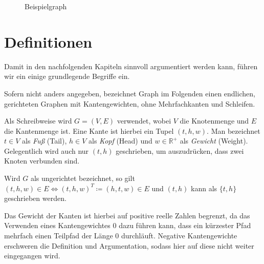 \begin{figure}[ht]
  \caption{Beispielgraph}
  \label{graphs:fig:beispielgraph}
\end{figure}

\section{Definitionen}
Damit in den nachfolgenden Kapiteln sinnvoll argumentiert werden kann, führen wir ein einige grundlegende Begriffe ein.

\begin{definition}[Graph]
  Sofern nicht anders angegeben, bezeichnet Graph im Folgenden einen endlichen, gerichteten Graphen mit Kantengewichten, ohne Mehrfachkanten und Schleifen.

  Als Schreibweise wird $G = (V, E)$ verwendet, wobei $V$ die Knotenmenge und $E$ die Kantenmenge ist. Eine Kante ist hierbei ein Tupel $(t, h, w)$. Man bezeichnet $t \in V$ als \emph{Fuß} (Tail), $h \in V$ als \emph{Kopf} (Head) und $w \in \mathbb{R}^+$ als \emph{Gewicht} (Weight). Gelegentlich wird auch nur $(t, h)$ geschrieben, um auszudrücken, dass zwei Knoten verbunden sind.

  Wird $G$ als ungerichtet bezeichnet, so gilt $(t, h, w) \in E \Leftrightarrow (t, h, w)^T \coloneq (h, t, w) \in E$ und $(t, h)$ kann als $\{ t, h \}$ geschrieben werden.
\end{definition}

Das Gewicht der Kanten ist hierbei auf positive reelle Zahlen begrenzt, da das Verwenden eines Kantengewichtes $0$ dazu führen kann, dass ein kürzester Pfad mehrfach einen Teilpfad der Länge 0 durchläuft.
Negative Kantengewichte erschweren die Definition und Argumentation, sodass hier auf diese nicht weiter eingegangen wird.


